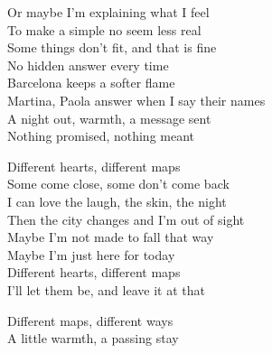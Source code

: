 \begin{lyrics}
Or maybe I’m explaining what I feel\\
To make a simple no seem less real\\
Some things don’t fit, and that is fine\\
No hidden answer every time\\
Barcelona keeps a softer flame\\
Martina, Paola answer when I say their names\\
A night out, warmth, a message sent\\
Nothing promised, nothing meant

Different hearts, different maps\\
Some come close, some don’t come back\\
I can love the laugh, the skin, the night\\
Then the city changes and I’m out of sight\\
Maybe I’m not made to fall that way\\
Maybe I’m just here for today\\
Different hearts, different maps\\
I’ll let them be, and leave it at that

Different maps, different ways\\
A little warmth, a passing stay
\end{lyrics}

